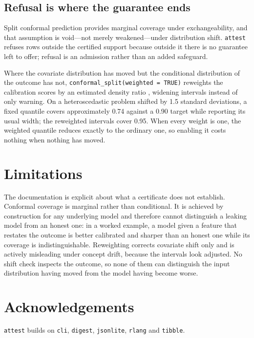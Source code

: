 \documentclass[11pt,a4paper]{article}
\begin{document}
\subsection{Refusal is where the guarantee ends}

Split conformal prediction \citep{vovk2005,lei2018} provides marginal coverage
under exchangeability, and that assumption is void---not merely
weakened---under distribution shift. \texttt{attest} refuses rows outside the
certified support because outside it there is no guarantee left to offer;
refusal is an admission rather than an added safeguard.

Where the covariate distribution has moved but the conditional distribution of
the outcome has not, \texttt{conformal\_split(weighted = TRUE)} reweights the
calibration scores by an estimated density ratio \citep{tibshirani2019},
widening intervals instead of only warning. On a heteroscedastic problem
shifted by 1.5 standard deviations, a fixed quantile covers approximately 0.74
against a 0.90 target while reporting its usual width; the reweighted intervals
cover 0.95. When every weight is one, the weighted quantile reduces exactly to
the ordinary one, so enabling it costs nothing when nothing has moved.

\section{Limitations}

The documentation is explicit about what a certificate does not establish.
Conformal coverage is marginal rather than conditional. It is achieved by
construction for any underlying model and therefore cannot distinguish a
leaking model from an honest one: in a worked example, a model given a feature
that restates the outcome is better calibrated and sharper than an honest one
while its coverage is indistinguishable. Reweighting corrects covariate shift
only and is actively misleading under concept drift, because the intervals look
adjusted. No shift check inspects the outcome, so none of them can distinguish
the input distribution having moved from the model having become worse.

\section*{Acknowledgements}

\texttt{attest} builds on \texttt{cli}, \texttt{digest}, \texttt{jsonlite},
\texttt{rlang} and \texttt{tibble}.



\end{document}
